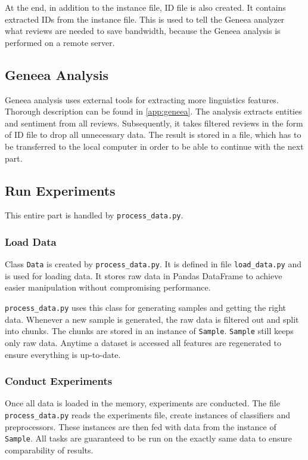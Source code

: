 At the end, in addition to the instance file, ID file is also created.
It contains extracted IDs from the instance file.
This is used to tell the Geneea analyzer what reviews are needed to save bandwidth,
because the Geneea analysis is performed on a remote server.

\subsection{Geneea Analysis}

Geneea analysis uses external tools for extracting more linguistics features.
Thorough description can be found in \autoref{app:geneea}.
The analysis extracts entities and sentiment from all reviews.
Subsequently, it takes filtered reviews in the form of ID file to drop all unnecessary data.
The result is stored in a file, which has to be transferred to the local computer in order to be able to continue with the next part.


\subsection{Run Experiments}

This entire part is handled by \texttt{process\_data.py}.


\subsubsection{Load Data}

Class \texttt{Data} is created by \texttt{process\_data.py}.
It is defined in file \texttt{load\_data.py} and is used for loading data.
It stores raw data in Pandas DataFrame to achieve easier manipulation without compromising performance.

\texttt{process\_data.py} uses this class for generating samples and getting the right data.
Whenever a new sample is generated, the raw data is filtered out and split into chunks.
The chunks are stored in an instance of \texttt{Sample}.
\texttt{Sample} still keeps only raw data.
Anytime a dataset is accessed all features are regenerated to ensure everything is up-to-date.


\subsubsection{Conduct Experiments}

Once all data is loaded in the memory, experiments are conducted.
The file \texttt{process\_data.py} reads the experiments file, create instances of classifiers and preprocessors.
These instances are then fed with data from the instance of \texttt{Sample}.
All tasks are guaranteed to be run on the exactly same data to ensure comparability of results.


